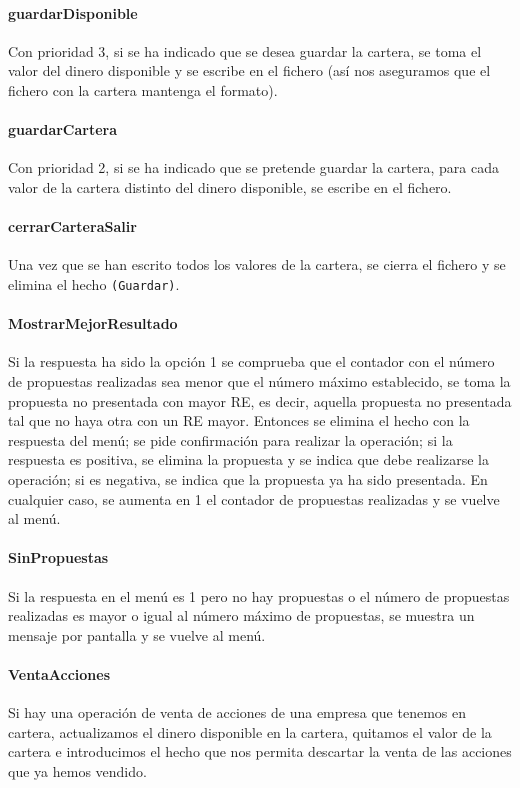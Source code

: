 \documentclass[11pt,leqno]{article}
\theoremstyle{definition_wo_parentheses}
\theoremstyle{plain}
\theoremstyle{remark}
\begin{document}
\paragraph{guardarDisponible} Con prioridad 3, si se ha indicado que se desea guardar la cartera, se toma el valor del dinero disponible y se escribe en el fichero (así nos aseguramos que el fichero con la cartera mantenga el formato).

\paragraph{guardarCartera} Con prioridad 2, si se ha indicado que se pretende guardar la cartera, para cada valor de la cartera distinto del dinero disponible, se escribe en el fichero.

\paragraph{cerrarCarteraSalir} Una vez que se han escrito todos los valores de la cartera, se cierra el fichero y se elimina el hecho \texttt{(Guardar)}.

\paragraph{MostrarMejorResultado} Si la respuesta ha sido la opción 1 se comprueba que el contador con el número de propuestas realizadas sea menor que el número máximo establecido, se toma la propuesta no presentada con mayor RE, es decir, aquella propuesta no presentada tal que no haya otra con un RE mayor. Entonces se elimina el hecho con la respuesta del menú; se pide confirmación para realizar la operación;  si la respuesta es positiva, se elimina la propuesta y se indica que debe realizarse la operación; si es negativa, se indica que la propuesta ya ha sido presentada. En cualquier caso, se aumenta en 1 el contador de propuestas realizadas y se vuelve al menú.

\paragraph{SinPropuestas} Si la respuesta en el menú es 1 pero no hay propuestas o el número de propuestas realizadas es mayor o igual al número máximo de propuestas, se muestra un mensaje por pantalla y se vuelve al menú. 

\paragraph{VentaAcciones} Si hay una operación de venta de acciones de una empresa que tenemos en cartera, actualizamos el dinero disponible en la cartera, quitamos el valor de la cartera e introducimos el hecho que nos permita descartar la venta de las acciones que ya hemos vendido.
\end{document}
